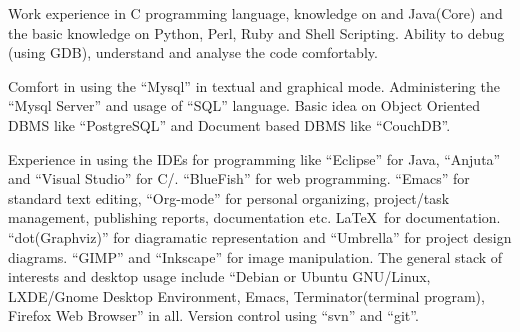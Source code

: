 \begin{resume}
\begin{position}
\end{position}

\dates{}
\begin{position}
Work experience in C programming language, knowledge on \Cplusplus
and Java(Core) and the basic knowledge on Python, Perl, Ruby and Shell
Scripting. Ability to debug (using GDB), understand and analyse the
code comfortably.
\end{position}

\dates{}
\begin{position}
Comfort in using the ``Mysql'' in textual and graphical
mode. Administering the ``Mysql Server'' and usage of ``SQL''
language. Basic idea on Object Oriented DBMS like ``PostgreSQL'' and
Document based DBMS like ``CouchDB''.  
\end{position}

\dates{}
\begin{position}
Experience in using the IDEs for programming like ``Eclipse'' for Java,
``Anjuta'' and ``Visual Studio'' for C/\Cplusplus. ``BlueFish'' for web
programming. ``Emacs'' for standard text editing, ``Org-mode'' for
personal organizing, project/task management, publishing reports,
documentation etc. \LaTeX \ for documentation. ``dot(Graphviz)'' for
diagramatic representation and ``Umbrella'' for project design
diagrams. ``GIMP'' and ``Inkscape'' for image manipulation. The
general stack of interests and desktop usage include ``Debian or
Ubuntu GNU/Linux, LXDE/Gnome Desktop Environment, Emacs,
Terminator(terminal program), Firefox Web Browser'' in all. Version
control using ``svn'' and ``git''.\\
\end{position} 







\end{resume}
